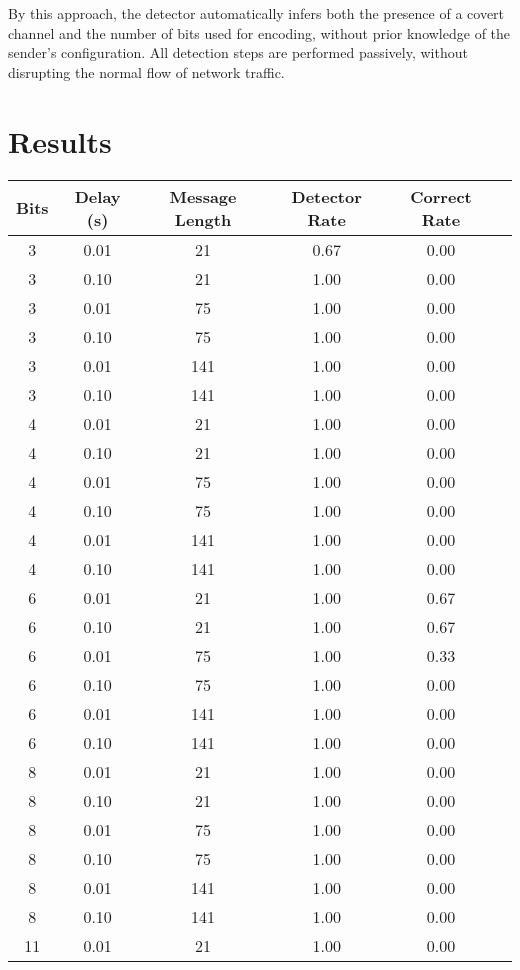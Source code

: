 \documentclass[10pt,a4paper]{article}
\begin{document}
By this approach, the detector automatically infers both the presence of a covert channel and the number of bits used for encoding, without prior knowledge of the sender's configuration.
All detection steps are performed passively, without disrupting the normal flow of network traffic.

\section*{Results}


\begin{table}[H]
\centering
\begin{tabular}{cccccc}
\toprule
Bits & Delay (s) & Message Length & Detector Rate & Correct Rate \\
\midrule
3  & 0.01 & 21  & 0.67 & 0.00 \\
3  & 0.10 & 21  & 1.00 & 0.00 \\
3  & 0.01 & 75  & 1.00 & 0.00 \\
3  & 0.10 & 75  & 1.00 & 0.00 \\
3  & 0.01 & 141 & 1.00 & 0.00 \\
3  & 0.10 & 141 & 1.00 & 0.00 \\
4  & 0.01 & 21  & 1.00 & 0.00 \\
4  & 0.10 & 21  & 1.00 & 0.00 \\
4  & 0.01 & 75  & 1.00 & 0.00 \\
4  & 0.10 & 75  & 1.00 & 0.00 \\
4  & 0.01 & 141 & 1.00 & 0.00 \\
4  & 0.10 & 141 & 1.00 & 0.00 \\
6  & 0.01 & 21  & 1.00 & 0.67 \\
6  & 0.10 & 21  & 1.00 & 0.67 \\
6  & 0.01 & 75  & 1.00 & 0.33 \\
6  & 0.10 & 75  & 1.00 & 0.00 \\
6  & 0.01 & 141 & 1.00 & 0.00 \\
6  & 0.10 & 141 & 1.00 & 0.00 \\
8  & 0.01 & 21  & 1.00 & 0.00 \\
8  & 0.10 & 21  & 1.00 & 0.00 \\
8  & 0.01 & 75  & 1.00 & 0.00 \\
8  & 0.10 & 75  & 1.00 & 0.00 \\
8  & 0.01 & 141 & 1.00 & 0.00 \\
8  & 0.10 & 141 & 1.00 & 0.00 \\
11 & 0.01 & 21  & 1.00 & 0.00 \\

\end{tabular}
\end{table}
\end{document}
